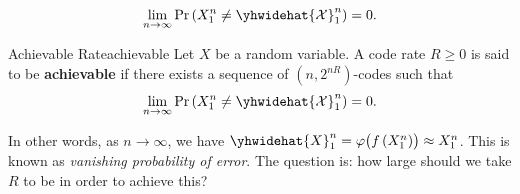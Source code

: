 \documentclass[math, code]{amznotes}
\theoremstyle{remark}
\begin{document}
\begin{equation*}
    \lim_{n \to \infty}\Pr\left(X_1^n \neq \yhwidehat{\mathcal{X}}_1^n\right) = 0.
\end{equation*} 
\begin{dfnbox}{Achievable Rate}{achievable}
    Let $X$ be a random variable. A code rate $R \geq 0$ is said to be {\color{red} \textbf{achievable}} if there exists a sequence of $\left(n, 2^{nR}\right)$-codes such that 
    \begin{equation*}
        \lim_{n \to \infty}\Pr\left(X_1^n \neq \yhwidehat{\mathcal{X}}_1^n\right) = 0.
    \end{equation*} 
\end{dfnbox}
In other words, as $n \to \infty$, we have $\yhwidehat{X}_1^n = \varphi\bigl(f\left(X_1^n\right)\bigr) \approx X_1^n$. This is known as \textit{vanishing probability of error}. The question is: how large should we take $R$ to be in order to achieve this?
\end{document}
